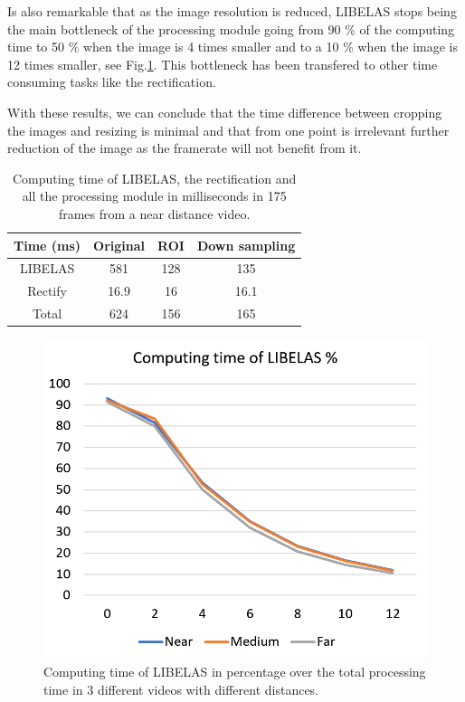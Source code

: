 \documentclass[10pt,a4paper,twocolumn,twoside]{article}
\begin{document}
	Is also remarkable that as the image resolution is reduced, LIBELAS stops being the main bottleneck of the processing module going from 90 \% of the computing time to 50 \% when the image is 4 times smaller and to a 10 \% when the image is 12 times smaller, see Fig.\ref{fig:libelaspercentatge}. This bottleneck has been transfered to other time consuming tasks like the rectification.
	
	With these results, we can conclude that the time difference between cropping the images and resizing is minimal and that from one point is irrelevant further reduction of the image as the framerate will not benefit from it.  
	
	\begin{table}
		\centering
		\begin{tabular}{@{}cccc@{}}
			\toprule
			Time (ms) & Original & ROI & Down sampling \\ \midrule
			LIBELAS   & 581      & 128 & 135           \\
			Rectify   & 16.9     & 16  & 16.1          \\
			Total     & 624      & 156 & 165           \\ \bottomrule
		\end{tabular}
		\caption{Computing time of LIBELAS, the rectification and all the processing module in milliseconds in 175 frames from a near distance video.}
		\label{tab:timeprocess}
	\end{table}
	
	\begin{figure}
		\centering
		\includegraphics[width=1\linewidth]{img/ComputingLibelas.PNG}
		\caption{Computing time of LIBELAS in percentage over the total processing time in 3 different videos with different distances.}
		\label{fig:libelaspercentatge}
	\end{figure}
	
\end{document}
